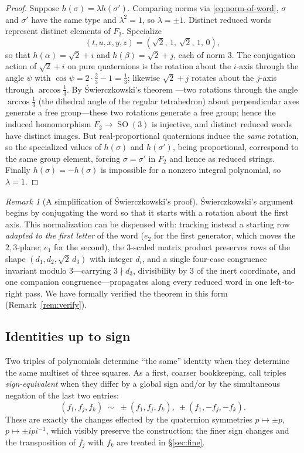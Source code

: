 \documentclass[11pt]{article}
\theoremstyle{definition}
\theoremstyle{remark}
\newtheorem{remark}[theorem]{Remark}
\DeclareMathOperator{\SO}{SO}
\begin{document}
\begin{proof}
Suppose $h(\sigma)=\lambda h(\sigma')$. Comparing norms via \eqref{eq:norm-of-word}, $\sigma$ and $\sigma'$ have the same type and $\lambda^2=1$, so $\lambda=\pm1$. Distinct reduced words represent distinct elements of $F_2$. Specialize
\[
(t,u,x,y,z)=(\sqrt2,\,1,\,\sqrt2,\,1,\,0),
\]
so that $h(\alpha)=\sqrt2+i$ and $h(\beta)=\sqrt2+j$, each of norm $3$. The conjugation action of $\sqrt2+i$ on pure quaternions is the rotation about the $i$-axis through the angle $\psi$ with $\cos\psi=2\cdot\frac23-1=\frac13$; likewise $\sqrt2+j$ rotates about the $j$-axis through $\arccos\frac13$. By Świerczkowski's theorem \cite{Swierczkowski}---two rotations through the angle $\arccos\frac13$ (the dihedral angle of the regular tetrahedron) about perpendicular axes generate a free group---these two rotations generate a free group; hence the induced homomorphism $F_2\to\SO(3)$ is injective, and distinct reduced words have distinct images. But real-proportional quaternions induce the \emph{same} rotation, so the specialized values of $h(\sigma)$ and $h(\sigma')$, being proportional, correspond to the same group element, forcing $\sigma=\sigma'$ in $F_2$ and hence as reduced strings. Finally $h(\sigma)=-h(\sigma)$ is impossible for a nonzero integral polynomial, so $\lambda=1$.
\end{proof}

\begin{remark}[A simplification of Świerczkowski's proof]\label{rem:swier-simpl}
Świerczkowski's argument begins by conjugating the word so that it starts with a rotation about the first axis. This normalization can be dispensed with: tracking instead a starting row \emph{adapted to the first letter} of the word ($e_2$ for the first generator, which moves the $2,3$-plane; $e_1$ for the second), the $3$-scaled matrix product preserves rows of the shape $(d_1,d_2,\sqrt2\,d_3)$ with integer $d_i$, and a single four-case congruence invariant modulo $3$---carrying $3\nmid d_3$, divisibility by $3$ of the inert coordinate, and one companion congruence---propagates along every reduced word in one left-to-right pass. We have formally verified the theorem in this form (Remark~\ref{rem:verify}).
\end{remark}

\subsection{Identities up to sign}
Two triples of polynomials determine ``the same'' identity when they determine the same multiset of three squares. As a first, coarser bookkeeping, call triples \emph{sign-equivalent} when they differ by a global sign and/or by the simultaneous negation of the last two entries:
\[
(f_1,f_j,f_k)\;\sim\;\pm(f_1,f_j,f_k),\ \pm(f_1,-f_j,-f_k).
\]
These are exactly the changes effected by the quaternion symmetries $p\mapsto\pm p$, $p\mapsto\pm ipi^{-1}$, which visibly preserve the construction; the finer sign changes and the transposition of $f_j$ with $f_k$ are treated in \S\ref{sec:fine}.
\end{document}
